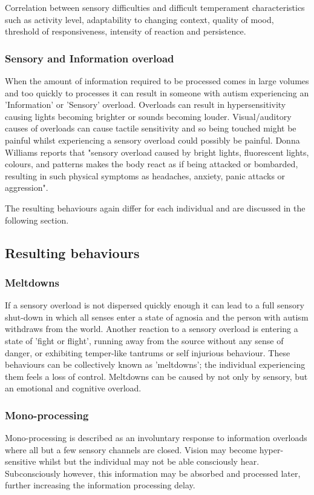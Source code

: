 \documentclass[11pt]{report}
\begin{document}
Correlation between sensory difficulties and difficult temperament characteristics such as activity level, adaptability to changing context, quality of mood, threshold of responsiveness, intensity of reaction and persistence\cite{temperament}. 

\subsubsection{Sensory and Information overload}

When the amount of information required to be processed comes in large volumes and too quickly to processes it can result in someone with autism experiencing an 'Information' or 'Sensory' overload. Overloads can result in hypersensitivity causing lights becoming brighter or sounds becoming louder. Visual/auditory causes of overloads can cause tactile sensitivity and so being touched might be painful whilst experiencing a sensory overload could possibly be painful. Donna Williams reports that "sensory overload caused by bright lights, fluorescent lights, colours, and patterns makes the body react as if being attacked or bombarded, resulting in such physical symptoms as headaches, anxiety, panic attacks or aggression"\cite{bayes}.

The resulting behaviours again differ for each individual and are discussed in the following section.

\subsection{Resulting behaviours}


\subsubsection{Meltdowns}
If a sensory overload is not dispersed quickly enough it can lead to a full sensory shut-down in which all senses enter a state of agnosia and the person with autism withdraws from the world. Another reaction to a sensory overload is entering a state of 'fight or flight', running away from the source without any sense of danger, or exhibiting temper-like tantrums or self injurious behaviour. These behaviours can be collectively known as 'meltdowns'; the individual experiencing them feels a loss of control. Meltdowns can be caused by not only by sensory, but an emotional and cognitive overload.

\subsubsection{Mono-processing}
Mono-processing is described as an involuntary response to information overloads where all but a few sensory channels are closed. Vision may become hyper-sensitive whilst but the individual may not be able consciously hear. Subconsciously however, this information may be absorbed and processed later, further increasing the information processing delay. 
\end{document}

